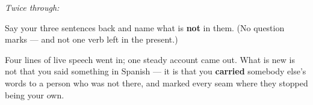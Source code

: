 \emph{Twice through:}

\begin{tcolorbox}[breakable,colback=teal!4,colframe=teal!35!black,title={Before you move on}]
Say your three sentences back and name what is \textbf{not} in them. (No question marks — and not one verb left in the present.)

Four lines of live speech went in; one steady account came out. What is new is not that you said something in Spanish — it is that you \textbf{carried} somebody else's words to a person who was not there, and marked every seam where they stopped being your own.
\end{tcolorbox}
